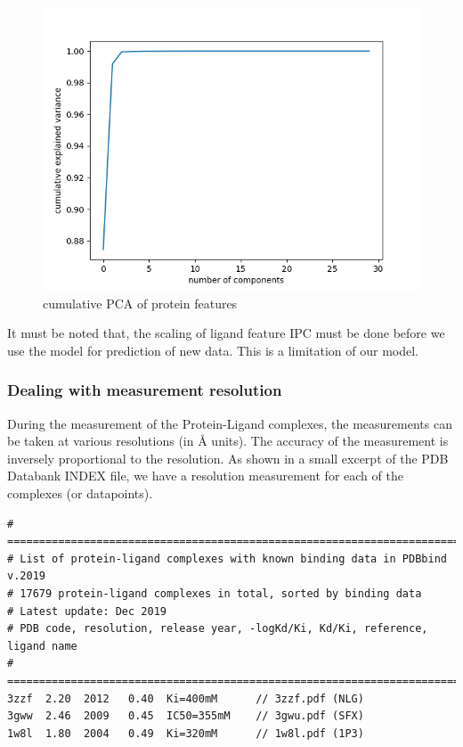 \documentclass[11pt]{article}
\begin{document}
\begin{figure}[htb]
  \centering
    \includegraphics[scale=0.7]{images/pcaproteinanalysis}
    \caption{cumulative PCA of protein features}
    \label{fig:pcaproteinanalysis}
\end{figure}

It must be noted that,  the scaling of ligand feature IPC must be done before we use the model for prediction of new data.
This is a limitation of our model.

\subsubsection{Dealing with measurement resolution}
During the measurement of the Protein-Ligand complexes,  the measurements can be taken at various resolutions (in \si{\angstrom} units).
The accuracy of the measurement is inversely proportional to the resolution.
As shown in a small excerpt of the PDB Databank INDEX file,  we have a resolution measurement for each of the complexes (or datapoints).

\begin{verbatim}
# ==============================================================================
# List of protein-ligand complexes with known binding data in PDBbind v.2019
# 17679 protein-ligand complexes in total, sorted by binding data
# Latest update: Dec 2019
# PDB code, resolution, release year, -logKd/Ki, Kd/Ki, reference, ligand name
# ==============================================================================
3zzf  2.20  2012   0.40  Ki=400mM      // 3zzf.pdf (NLG)
3gww  2.46  2009   0.45  IC50=355mM    // 3gwu.pdf (SFX)
1w8l  1.80  2004   0.49  Ki=320mM      // 1w8l.pdf (1P3)
\end{verbatim}
\end{document}
